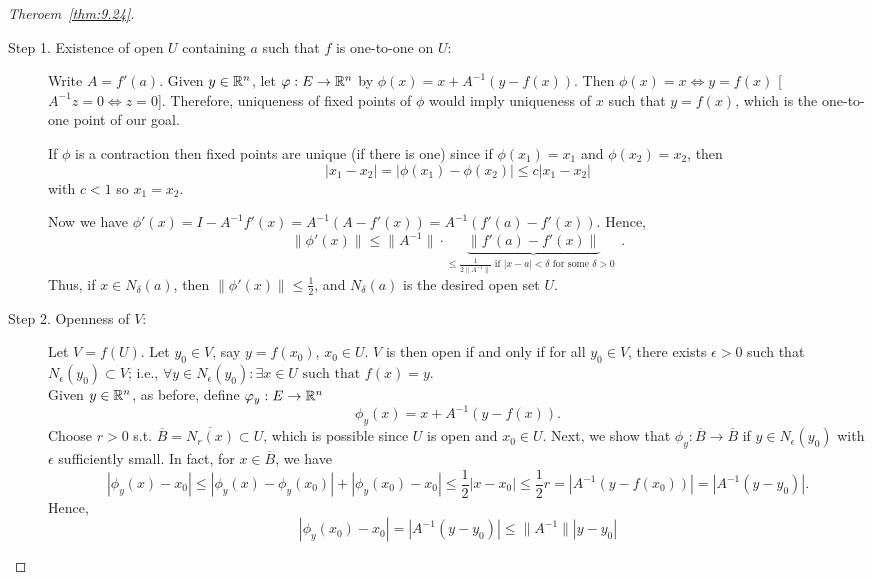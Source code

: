 \begin{proof}[Theroem~\ref{thm:9.24}]
	\hfill
	\begin{description}
		\item[Step 1. Existence of open $U$ containing $a$ such that $f$ is one-to-one on $U$:]
		      Write $A=f'(a)$. Given $y \in \mathbb{R}^{n}$, let $\varphi:E\to \mathbb{R}^{n}$ by $\phi(x)=x+A^{-1}(y-f(x))$.
		      Then $\phi(x)=x \Leftrightarrow y=f(x)$ [$A^{-1}z=0 \Leftrightarrow z=0$].
		      Therefore, uniqueness of fixed points of $\phi$ would imply uniqueness of $x$ such that $y=f(x)$, which is the one-to-one point of our goal.
		      \begin{note}
			      If $\phi$ is a contraction then fixed points are unique (if there is one) since if $\phi(x_{1})=x_{1}$ and $\phi(x_{2})=x_{2}$, then \[
				      \left|x_{1}-x_{2}\right|=\left|\phi(x_{1})-\phi(x_{2})\right|\le c \left|x_{1}-x_{2}\right|
			      \] with $c<1$ so $x_{1}=x_{2}$.
		      \end{note}
		      Now we have $\phi'(x)=I-A^{-1}f'(x)=A^{-1}(A-f'(x))=A^{-1}(f'(a) - f'(x))$.
		      Hence, \[
			      \|\phi'(x)\|\le \|A^{-1}\|\cdot \underbrace{\|f'(a)-f'(x)\|}_{\le \frac{1}{2 \|A^{-1}\|} \text{ if $\left|x-a\right|<\delta$ for some $\delta>0$ }}
			      .\]
		      Thus, if $x \in N_{\delta}(a)$, then $\|\phi'(x)\|\le \frac{1}{2}$, and $N_\delta(a)$ is the desired open set $U$.
		\item[Step 2. Openness of $V$:]
		      Let $V=f(U)$.
		      Let $y_{0} \in V$, say $y=f(x_{0})$, $x_{0} \in U$.
		      $V$ is then open if and only if for all $y_{0} \in V$, there exists $\epsilon>0$ such that $N_{\epsilon}(y_{0}) \subset V$; i.e., $\forall{y \in N_\epsilon (y_{0})}: \exists{x \in U} \text{ such that } f(x)=y$.\\
		      Given $y \in \mathbb{R}^{n}$, as before, define $\varphi_y: E\to \mathbb{R}^{n}$ \[
			      \phi_y(x)=x+A^{-1}(y-f(x))
			      .\]
		      Choose $r>0$ s.t. $\overline{B}=\overline{N_r(x)} \subset U$, which is possible since $U$ is open and $x_{0} \in U$.
		      Next, we show that $\phi_y:\overline{B}\to \overline{B}$ if $y \in N_{\epsilon}(y_{0})$ with $\epsilon$ sufficiently small.
		      In fact, for $x \in \overline{B}$, we have
		      \[
			      \left|\phi_y(x)-x_{0}\right|\le  \left|\phi_y(x)-\phi_y(x_{0})\right|+ \left|\phi_y(x_{0})-x_{0}\right| \le \frac{1}{2}\left|x-x_{0}\right|\le \frac{1}{2}r=\left|A^{-1}(y-f(x_{0}))\right|=\left|A^{-1}(y-y_{0})\right|
			      .\]
		      Hence,
		      \[
			      \left|\phi_y(x_{0})-x_{0}\right|=\left|A^{-1}(y-y_{0})\right|\le \|A^{-1}\| \left|y-y_{0}\right|
\]
\end{description}
\end{proof}

